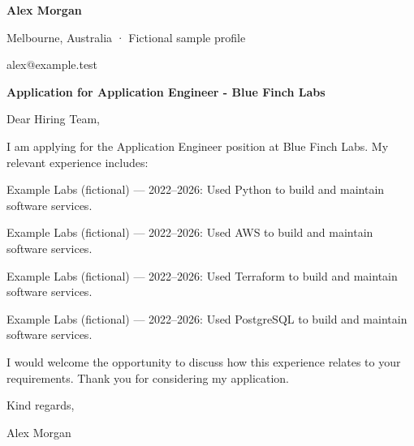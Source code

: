 \documentclass[10pt,a4paper]{article}
\begin{document}
{\LARGE\bfseries\color{navy} Alex Morgan}\par
Melbourne, Australia · Fictional sample profile\par
alex@example.test\par
{\large\bfseries\color{navy} Application for Application Engineer - Blue Finch Labs}\par
Dear Hiring Team,\par
I am applying for the Application Engineer position at Blue Finch Labs. My relevant experience includes:\par
Example Labs (fictional) — 2022–2026: Used Python to build and maintain software services.\par
Example Labs (fictional) — 2022–2026: Used AWS to build and maintain software services.\par
Example Labs (fictional) — 2022–2026: Used Terraform to build and maintain software services.\par
Example Labs (fictional) — 2022–2026: Used PostgreSQL to build and maintain software services.\par
I would welcome the opportunity to discuss how this experience relates to your requirements. Thank you for considering my application.\par
Kind regards,\par
Alex Morgan\par
\end{document}
